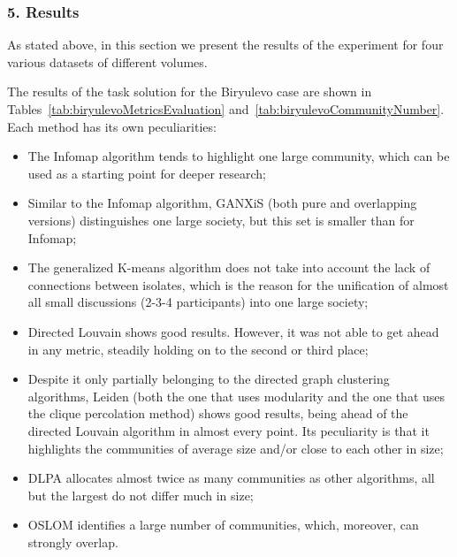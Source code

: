 \subsubsection{5. Results}

As stated above, in this section we present the results of the experiment for four various datasets of different volumes.

The results of the task solution for the Biryulevo case are shown in Tables~\cref{tab:biryulevoMetricsEvaluation} and~\cref{tab:biryulevoCommunityNumber}. Each method has its own peculiarities:

\begin{itemize}
	\item The Infomap algorithm tends to highlight one large community, which can be used as a starting point for deeper research;
	\item Similar to the Infomap algorithm, GANXiS (both pure and overlapping versions) distinguishes one large society, but this set is smaller than for Infomap;
	\item The generalized K-means algorithm does not take into account the lack of connections between isolates, which is the reason for the unification of almost all small discussions (2-3-4 participants) into one large society;
	\item Directed Louvain shows good results. However, it was not able to get ahead in any metric, steadily holding on to the second or third place;
	\item Despite it only partially belonging to the directed graph clustering algorithms, Leiden (both the one that uses modularity and the one that uses the clique percolation method) shows good results, being ahead of the directed Louvain algorithm in almost every point. Its peculiarity is that it highlights the communities of average size and/or close to each other in size;
	\item DLPA allocates almost twice as many communities as other algorithms, all but the largest do not differ much in size;
	\item OSLOM identifies a large number of communities, which, moreover, can strongly overlap. 
\end{itemize}

